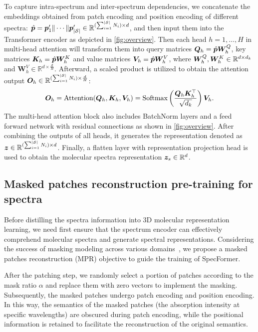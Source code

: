 To capture intra-spectrum and inter-spectrum dependencies, we concatenate the embeddings obtained from patch encoding and position encoding of different spectra: $\hat{{\bm{p}}} = {\bm{p}}_1^{\prime}\| \cdots \| {\bm{p}}_{|\mathcal{S}|}^{\prime} \in \mathbb{R}^{(\sum_{i=1}^{|\mathcal{S}|} N_i) \times d}$, and then input them into the Transformer encoder as depicted in \cref{fig:overview}.
Then each head $h = 1, \ldots, H$ in multi-head attention will transform them into query matrices ${\bm{Q}}_h = \hat{{\bm{p}}} {\bm{W}}_h^Q$, key matrices ${\bm{K}}_h = \hat{{\bm{p}}} {\bm{W}}_h^K$ and value matrices ${\bm{V}}_h = \hat{{\bm{p}}} {\bm{W}}_h^V$, where ${\bm{W}}_h^Q, {\bm{W}}_h^K \in \mathbb{R}^{d \times d_k}$ and $\mathbf{W}_h^V \in \mathbb{R}^{d \times \frac{d}{H}}$.  Afterward, a scaled product is utilized to obtain the attention output ${\bm{O}}_h \in \mathbb{R}^{(\sum_{i=1}^{|\mathcal{S}|} N_i) \times \frac{d}{H}}$:
\begin{equation}
{\bm{O}}_h = \text{Attention}({\bm{Q}}_h, {\bm{K}}_h, {\bm{V}}_h) = \text{Softmax}\left(\frac{{\bm{Q}}_h {\bm{K}}_h^{\top}}{\sqrt{d_k}}\right){\bm{V}}_h.
\end{equation}
The multi-head attention block also includes BatchNorm layers and a feed forward network with residual connections as shown in \cref{fig:overview}. After combining the outputs of all heads, it generates the representation denoted as ${\bm{z}} \in \mathbb{R}^{(\sum_{i=1}^{|\mathcal{S}|} N_i) \times d}$. Finally, a flatten layer with representation projection head is used to obtain the molecular spectra representation ${\bm{z}}_s \in \mathbb{R}^{d}$.


\subsection{Masked patches reconstruction pre-training for spectra}

Before distilling the spectra information into 3D molecular representation learning, we need first ensure that the spectrum encoder can effectively comprehend molecular spectra and generate spectral representations. Considering the success of masking modeling across various domains~\citep{Bert,MAE,GraphMAE,Mole-Bert,AUG-MAE,PatchTST}, we propose a masked patches reconstruction (MPR) objective to guide the training of SpecFormer.

After the patching step, we randomly select a portion of patches according to the mask ratio $\alpha$ and replace them with zero vectors to implement the masking. Subsequently, the masked patches undergo patch encoding and position encoding. In this way, the semantics of the masked patches (the absorption intensity at specific wavelengths) are obscured during patch encoding, while the positional information is retained to facilitate the reconstruction of the original semantics.

